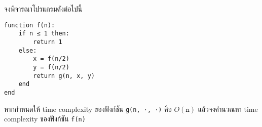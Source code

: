 \question{}

จงพิจารณาโปรแกรมดังต่อไปนี้
\begin{lstlisting}
function f(n):
    if n ≤ 1 then:
        return 1
    else:
        x = f(n/2)
        y = f(n/2)
        return g(n, x, y)
    end
end
\end{lstlisting}

หากกำหนดให้ time complexity ของฟังก์ชัน \lstinline{g(n, ·, ·)} คือ $O(\mathtt{n})$ 
แล้วจงคำนวณหา time complexity ของฟังก์ชัน \lstinline{f(n)}
